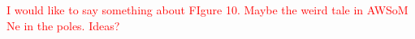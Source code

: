 \documentclass[namedreferences]{solarphysics}
\def\diego#1{\textcolor{red}{#1}}
\begin{document}
\begin{article}
\diego{I would like to say something about FIgure 10. Maybe the weird tale in AWSoM Ne in the poles. Ideas?}\\


%



%
  

%



%
%


%
%

  
%
%
%   
%  

\end{article} 
\end{document}
